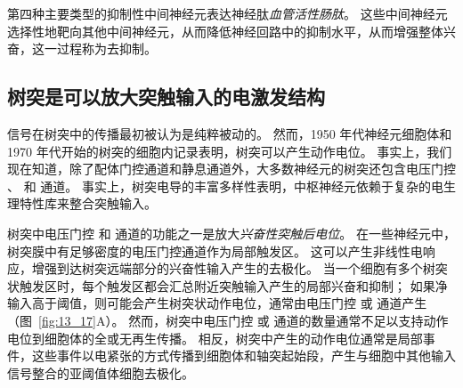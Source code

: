 第四种主要类型的抑制性中间神经元表达神经肽\textit{血管活性肠肽}。
这些中间神经元选择性地靶向其他中间神经元，从而降低神经回路中的抑制水平，从而增强整体兴奋，这一过程称为去抑制。



\subsection{树突是可以放大突触输入的电激发结构}

信号在树突中的传播最初被认为是纯粹被动的。
然而，1950 年代神经元细胞体和 1970 年代开始的树突的细胞内记录表明，树突可以产生动作电位。
事实上，我们现在知道，除了配体门控通道和静息通道外，大多数神经元的树突还包含电压门控 、 和  通道。
事实上，树突电导的丰富多样性表明，中枢神经元依赖于复杂的电生理特性库来整合突触输入。


树突中电压门控  和  通道的功能之一是放大\textit{兴奋性突触后电位}。
在一些神经元中，树突膜中有足够密度的电压门控通道作为局部触发区。
这可以产生非线性电响应，增强到达树突远端部分的兴奋性输入产生的去极化。
当一个细胞有多个树突状触发区时，每个触发区都会汇总附近突触输入产生的局部兴奋和抑制；
如果净输入高于阈值，则可能会产生树突状动作电位，通常由电压门控  或  通道产生（图~\ref{fig:13_17}A）。
然而，树突中电压门控  或  通道的数量通常不足以支持动作电位到细胞体的全或无再生传播。
相反，树突中产生的动作电位通常是局部事件，这些事件以电紧张的方式传播到细胞体和轴突起始段，产生与细胞中其他输入信号整合的亚阈值体细胞去极化。


